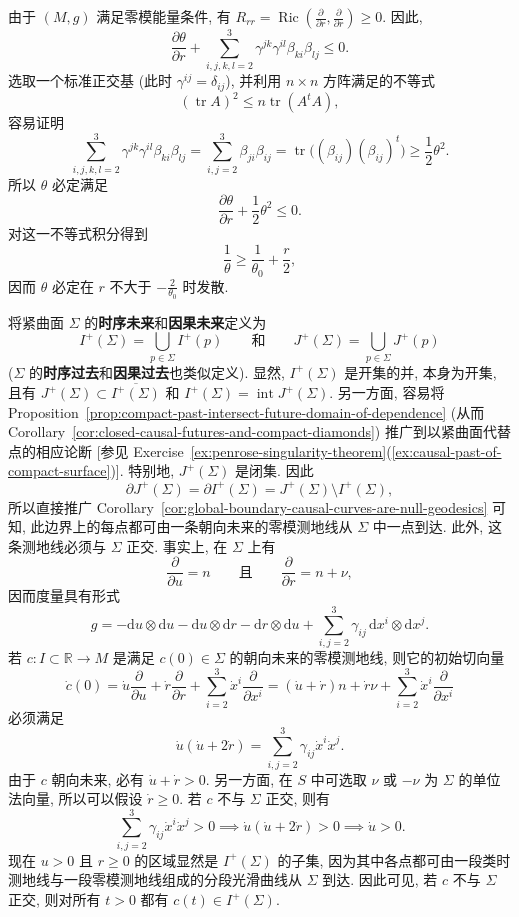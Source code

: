 \begin{RiemannProof}
由于 $(M,g)$ 满足零模能量条件, 有 $R_{rr}=\operatorname{Ric}(\frac{\partial}{\partial r},\frac{\partial}{\partial r})\geq0$. 因此,
\[
  \frac{\partial\theta}{\partial r}
     +\sum_{i,j,k,l=2}^3\gamma^{jk}\gamma^{il}\beta_{ki}\beta_{lj}\leq0.
\]
选取一个标准正交基 (此时 $\gamma^{ij}=\delta_{ij}$), 并利用 $n\times n$ 方阵满足的不等式
\[
  (\operatorname{tr}A)^2\leq n\operatorname{tr}(A^tA),
\]
容易证明
\[
  \sum_{i,j,k,l=2}^3\gamma^{jk}\gamma^{il}\beta_{ki}\beta_{lj}
    =\sum_{i,j=2}^3\beta_{ji}\beta_{ij}
    =\operatorname{tr}\bigl((\beta_{ij})(\beta_{ij})^t\bigr)\geq\frac12\theta^2.
\]
所以 $\theta$ 必定满足
\[
  \frac{\partial\theta}{\partial r}+\frac12\theta^2\leq0.
\]
对这一不等式积分得到
\[
  \frac{1}{\theta}\geq\frac{1}{\theta_0}+\frac{r}{2},
\]
因而 $\theta$ 必定在 $r$ 不大于 $-\frac{2}{\theta_0}$ 时发散.
\end{RiemannProof}

将紧曲面 $\Sigma$ 的\label{idx:chronological-and-causal-sets-of-compact-surface}\textbf{时序未来}和\textbf{因果未来}定义为
\[
  I^+(\Sigma)=\bigcup_{p\in\Sigma}I^+(p)
  \qquad\text{和}\qquad
  J^+(\Sigma)=\bigcup_{p\in\Sigma}J^+(p)
\]
($\Sigma$ 的\textbf{时序过去}和\textbf{因果过去}也类似定义). 显然, $I^+(\Sigma)$ 是开集的并, 本身为开集, 且有 $J^+(\Sigma)\subset\overline{I^+(\Sigma)}$ 和 $I^+(\Sigma)=\operatorname{int}J^+(\Sigma)$. 另一方面, 容易将 Proposition~\ref{prop:compact-past-intersect-future-domain-of-dependence} (从而 Corollary~\ref{cor:closed-causal-futures-and-compact-diamonds}) 推广到以紧曲面代替点的相应论断 [参见 Exercise~\ref{ex:penrose-singularity-theorem}(\ref{ex:causal-past-of-compact-surface})]. 特别地, $J^+(\Sigma)$ 是闭集. 因此
\[
  \partial J^+(\Sigma)=\partial I^+(\Sigma)=J^+(\Sigma)\setminus I^+(\Sigma),
\]
所以直接推广 Corollary~\ref{cor:global-boundary-causal-curves-are-null-geodesics} 可知, 此边界上的每点都可由一条朝向未来的零模测地线从 $\Sigma$ 中一点到达. 此外, 这条测地线必须与 $\Sigma$ 正交. 事实上, 在 $\Sigma$ 上有
\[
  \frac{\partial}{\partial u}=n
  \qquad\text{且}\qquad\frac{\partial}{\partial r}=n+\nu,
\]
因而度量具有形式
\[
  g=-\mathrm{d}u\otimes\mathrm{d}u-\mathrm{d}u\otimes\mathrm{d}r
    -\mathrm{d}r\otimes\mathrm{d}u
    +\sum_{i,j=2}^3\gamma_{ij}\,\mathrm{d}x^i\otimes\mathrm{d}x^j.
\]
若 $c:I\subset\mathbb{R}\to M$ 是满足 $c(0)\in\Sigma$ 的朝向未来的零模测地线, 则它的初始切向量
\[
  \dot c(0)=\dot u\frac{\partial}{\partial u}
         +\dot r\frac{\partial}{\partial r}
         +\sum_{i=2}^3\dot x^i\frac{\partial}{\partial x^i}
       =(\dot u+\dot r)n+\dot r\nu
         +\sum_{i=2}^3\dot x^i\frac{\partial}{\partial x^i}
\]
必须满足
\[
  \dot u(\dot u+2\dot r)=\sum_{i,j=2}^3\gamma_{ij}\dot x^i\dot x^j.
\]
由于 $c$ 朝向未来, 必有 $\dot u+\dot r>0$. 另一方面, 在 $S$ 中可选取 $\nu$ 或 $-\nu$ 为 $\Sigma$ 的单位法向量, 所以可以假设 $\dot r\geq0$. 若 $c$ 不与 $\Sigma$ 正交, 则有
\[
  \sum_{i,j=2}^3\gamma_{ij}\dot x^i\dot x^j>0
    \implies\dot u(\dot u+2\dot r)>0\implies\dot u>0.
\]
现在 $u>0$ 且 $r\geq0$ 的区域显然是 $I^+(\Sigma)$ 的子集, 因为其中各点都可由一段类时测地线与一段零模测地线组成的分段光滑曲线从 $\Sigma$ 到达. 因此可见, 若 $c$ 不与 $\Sigma$ 正交, 则对所有 $t>0$ 都有 $c(t)\in I^+(\Sigma)$.

